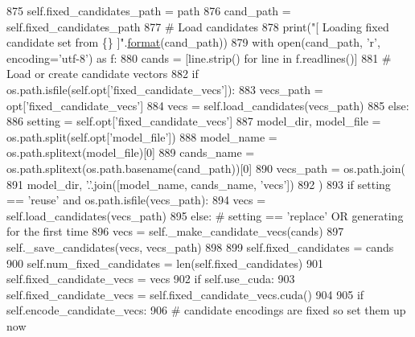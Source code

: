 \begin{DoxyCode}
875                         self.fixed\_candidates\_path = path
876                         cand\_path = self.fixed\_candidates\_path
877                 \textcolor{comment}{# Load candidates}
878                 print(\textcolor{stringliteral}{"[ Loading fixed candidate set from \{\} ]"}.\hyperlink{namespaceparlai_1_1chat__service_1_1services_1_1messenger_1_1shared__utils_a32e2e2022b824fbaf80c747160b52a76}{format}(cand\_path))
879                 with open(cand\_path, \textcolor{stringliteral}{'r', encoding='}utf-8') as f:
880                     cands = [line.strip() \textcolor{keywordflow}{for} line \textcolor{keywordflow}{in} f.readlines()]
881                 \textcolor{comment}{# Load or create candidate vectors}
882                 \textcolor{keywordflow}{if} os.path.isfile(self.opt[\textcolor{stringliteral}{'fixed\_candidate\_vecs'}]):
883                     vecs\_path = opt[\textcolor{stringliteral}{'fixed\_candidate\_vecs'}]
884                     vecs = self.load\_candidates(vecs\_path)
885                 \textcolor{keywordflow}{else}:
886                     setting = self.opt[\textcolor{stringliteral}{'fixed\_candidate\_vecs'}]
887                     model\_dir, model\_file = os.path.split(self.opt[\textcolor{stringliteral}{'model\_file'}])
888                     model\_name = os.path.splitext(model\_file)[0]
889                     cands\_name = os.path.splitext(os.path.basename(cand\_path))[0]
890                     vecs\_path = os.path.join(
891                         model\_dir, \textcolor{stringliteral}{'.'}.join([model\_name, cands\_name, \textcolor{stringliteral}{'vecs'}])
892                     )
893                     \textcolor{keywordflow}{if} setting == \textcolor{stringliteral}{'reuse'} \textcolor{keywordflow}{and} os.path.isfile(vecs\_path):
894                         vecs = self.load\_candidates(vecs\_path)
895                     \textcolor{keywordflow}{else}:  \textcolor{comment}{# setting == 'replace' OR generating for the first time}
896                         vecs = self.\_make\_candidate\_vecs(cands)
897                         self.\_save\_candidates(vecs, vecs\_path)
898 
899                 self.fixed\_candidates = cands
900                 self.num\_fixed\_candidates = len(self.fixed\_candidates)
901                 self.fixed\_candidate\_vecs = vecs
902                 \textcolor{keywordflow}{if} self.use\_cuda:
903                     self.fixed\_candidate\_vecs = self.fixed\_candidate\_vecs.cuda()
904 
905                 \textcolor{keywordflow}{if} self.encode\_candidate\_vecs:
906                     \textcolor{comment}{# candidate encodings are fixed so set them up now}

\end{DoxyCode}
